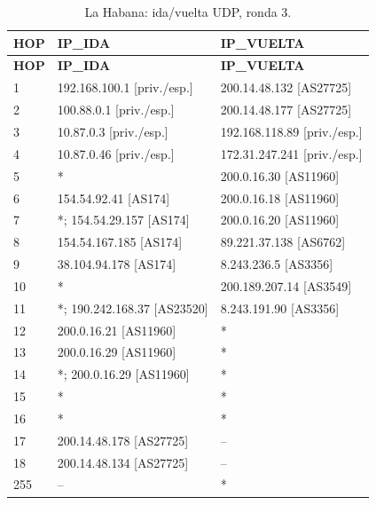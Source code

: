 \endgroup
\begingroup
\fontsize{9}{11}\selectfont
\begin{longtable}{p{0.95cm}p{7.075cm}p{7.075cm}}
\caption{La Habana: ida/vuelta UDP, ronda 3.}\label{anexo:vuelta:200.14.48.134:UDP:3} \\
\toprule
\textbf{HOP} & \textbf{IP\_\allowbreak{}IDA} & \textbf{IP\_\allowbreak{}VUELTA} \\ \midrule
\endfirsthead
\toprule
\textbf{HOP} & \textbf{IP\_\allowbreak{}IDA} & \textbf{IP\_\allowbreak{}VUELTA} \\ \midrule
\endhead
1 & 192.168.100.1 [priv./esp.] & 200.14.48.132 [AS27725] \\
2 & 100.88.0.1 [priv./esp.] & 200.14.48.177 [AS27725] \\
3 & 10.87.0.3 [priv./esp.] & 192.168.118.89 [priv./esp.] \\
4 & 10.87.0.46 [priv./esp.] & 172.31.247.241 [priv./esp.] \\
5 & * & 200.0.16.30 [AS11960] \\
6 & 154.54.92.41 [AS174] & 200.0.16.18 [AS11960] \\
7 & *; 154.54.29.157 [AS174] & 200.0.16.20 [AS11960] \\
8 & 154.54.167.185 [AS174] & 89.221.37.138 [AS6762] \\
9 & 38.104.94.178 [AS174] & 8.243.236.5 [AS3356] \\
10 & * & 200.189.207.14 [AS3549] \\
11 & *; 190.242.168.37 [AS23520] & 8.243.191.90 [AS3356] \\
12 & 200.0.16.21 [AS11960] & * \\
13 & 200.0.16.29 [AS11960] & * \\
14 & *; 200.0.16.29 [AS11960] & * \\
15 & * & * \\
16 & * & * \\
17 & 200.14.48.178 [AS27725] & -- \\
18 & 200.14.48.134 [AS27725] & -- \\
255 & -- & * \\
\bottomrule
\end{longtable}
\endgroup
\begingroup
\fontsize{9}{11}\selectfont
